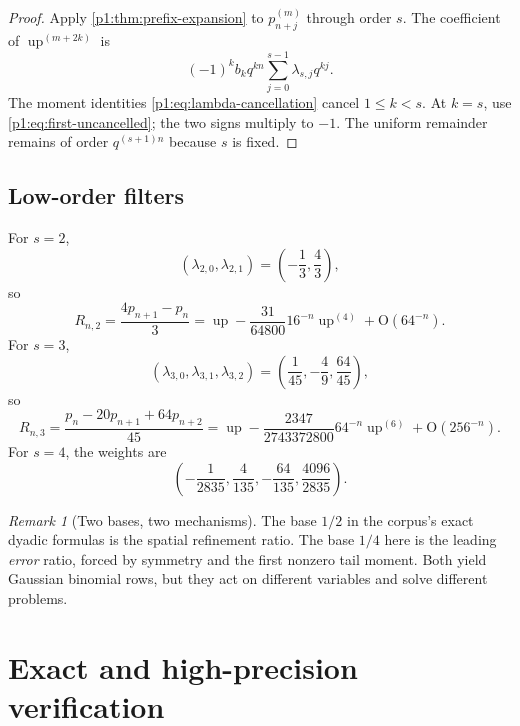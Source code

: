 \documentclass[11pt]{article}
\numberwithin{equation}{section}
\theoremstyle{definition}
\theoremstyle{remark}
\newtheorem{remark}[theorem]{Remark}
\newcommand{\Up}{\operatorname{up}}
\newcommand{\Oh}{\mathrm O}
\begin{document}
\begin{proof}
Apply \cref{p1:thm:prefix-expansion} to $p_{n+j}^{(m)}$ through order $s$.  The coefficient of
\(\Up^{(m+2k)}\) is
\[
 (-1)^kb_kq^{kn}\sum_{j=0}^{s-1}\lambda_{s,j}q^{kj}.
\]
The moment identities \eqref{p1:eq:lambda-cancellation} cancel $1\le k<s$.  At $k=s$, use \eqref{p1:eq:first-uncancelled}; the two signs multiply to $-1$.  The uniform remainder remains of order $q^{(s+1)n}$ because $s$ is fixed.
\end{proof}

\subsection{Low-order filters}

For $s=2$,
\begin{equation}
 (\lambda_{2,0},\lambda_{2,1})=\left(-\frac13,\frac43\right),
 \end{equation}
so
\begin{equation}
 \boxed{
 R_{n,2}=\frac{4p_{n+1}-p_n}{3}
 =\Up-\frac{31}{64800}16^{-n}\Up^{(4)}+\Oh(64^{-n}).}
 \label{p1:eq:Rn2}
\end{equation}
For $s=3$,
\begin{equation}
 (\lambda_{3,0},\lambda_{3,1},\lambda_{3,2})
 =\left(\frac1{45},-\frac49,\frac{64}{45}\right),
\end{equation}
so
\begin{equation}
 \boxed{
 R_{n,3}=\frac{p_n-20p_{n+1}+64p_{n+2}}{45}
 =\Up-\frac{2347}{2743372800}64^{-n}\Up^{(6)}
 +\Oh(256^{-n}).}
 \label{p1:eq:Rn3}
\end{equation}
For $s=4$, the weights are
\begin{equation}
 \left(-\frac1{2835},\frac4{135},-\frac{64}{135},\frac{4096}{2835}\right).
 \label{p1:eq:R4-weights}
\end{equation}

\begin{remark}[Two bases, two mechanisms]
The base $1/2$ in the corpus's exact dyadic formulas is the spatial refinement ratio.  The base $1/4$ here is the leading \emph{error} ratio, forced by symmetry and the first nonzero tail moment.  Both yield Gaussian binomial rows, but they act on different variables and solve different problems.
\end{remark}

\section{Exact and high-precision verification}
\label{p1:sec:verification}
\end{document}
